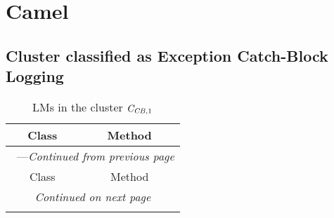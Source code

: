 \section{Camel}\label{camel}

\subsection{Cluster classified as Exception Catch-Block Logging}

\begin{center}
\begin{longtable}{ll}
\caption{LMs in the cluster $\mathit{C}_{\mathit{CB},1}$}\\
\toprule\multicolumn{1}{c}{Class}&\multicolumn{1}{c}{Method}\\\midrule
\endfirsthead

\multicolumn{2}{c}{\tablename\ \thetable{}---\textit{Continued from previous page}} \\\midrule
\multicolumn{1}{c}{Class}&\multicolumn{1}{c}{Method}\\\midrule
\endhead
\multicolumn{2}{c}{\textit{Continued on next page}}\\\midrule
\endfoot
\bottomrule
\endlastfoot


\end{longtable}
\end{center}
